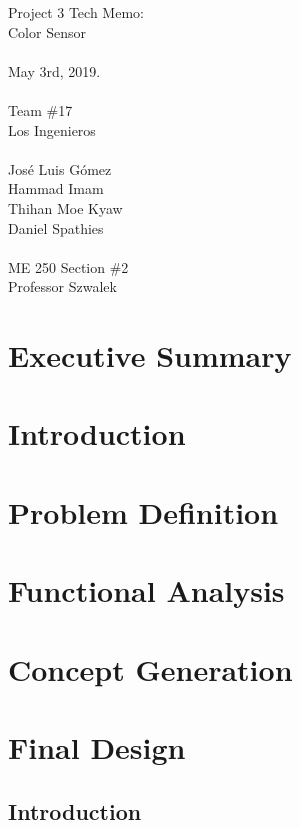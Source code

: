 \documentclass{article}
\begin{document}
\begin{center}
    \Huge{Project 3 Tech Memo: \\ Color Sensor \\~\\}
    \LARGE{  May 3rd, 2019. \\~\\ Team \#17 \\ Los Ingenieros \\~\\ José Luis Gómez \\ Hammad Imam \\ Thihan Moe Kyaw \\ Daniel Spathies \\~\\ ME 250 Section \#2 \\ Professor Szwalek}
\thispagestyle{empty}
\end{center}

\newpage

\section*{Executive Summary}

\newpage
\tableofcontents

\newpage
\section{Introduction}

\newpage
\section{Problem Definition}

\newpage
\section{Functional Analysis}

\newpage
\section{Concept Generation}

\newpage
\section{Final Design}
\subsection{Introduction}
\end{document}
